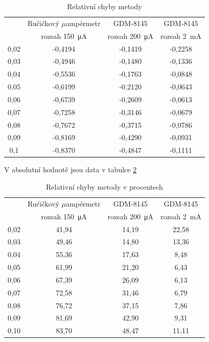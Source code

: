 \documentclass[a4paper,12pt]{article}   %
\newcommand{\tmu}{$\mu$}
\begin{document}
\begin{table}[h!]
    \centering
    \begin{tabular}{|c|c|c|c|}
        \hline
        \rule{0pt}{2.5ex}
        \multirow{2}{*}{Napětí na děliči} &Ručičkový \tmu ampérmetr	&GDM-8145 	&GDM-8145 \\[.7ex]
        & rozsah  150~μA & rozsah 200~μA & rozsah  2~mA \\\hline\hline
        0,02 & -0,4194 & -0,1419 & -0,2258 \\\hline
        0,03 & -0,4946 & -0,1480 & -0,1336 \\\hline 
        0,04 & -0,5536 & -0,1763 & -0,0848 \\\hline 
        0,05 & -0,6199 & -0,2120 & -0,0643 \\\hline
        0,06 & -0,6739 & -0,2609 & -0,0613 \\\hline
        0,07 & -0,7258 & -0,3146 & -0,0679 \\\hline
        0,08 & -0,7672 & -0,3715 & -0,0786 \\\hline
        0,09 & -0,8169 & -0,4290 & -0,0931 \\\hline
        0,1  & -0,8370 & -0,4847 & -0,1111 \\\hline
    \end{tabular}
    \caption{Relativní chyby metody}
    \label{tab:rel}
\end{table}
V absolutní hodnotě jsou data v tabulce \ref{tab:rel_percent}
\begin{table}[h!]
    \centering
    \begin{tabular}{|c|c|c|c|}
        \hline
        \rule{0pt}{2.5ex}
        \multirow{2}{*}{Napětí na děliči} &Ručičkový \tmu ampérmetr	&GDM-8145 	&GDM-8145 \\[.7ex]
        & rozsah  150~μA & rozsah 200~μA & rozsah  2~mA \\\hline\hline
        0,02&41,94&14,19&22,58  \\\hline
        0,03&49,46&14,80&13,36  \\\hline
        0,04&55,36&17,63&8,48   \\\hline
        0,05&61,99&21,20&6,43   \\\hline
        0,06&67,39&26,09&6,13   \\\hline
        0,07&72,58&31,46&6,79   \\\hline
        0,08&76,72&37,15&7,86   \\\hline
        0,09&81,69&42,90&9,31   \\\hline
        0,10&83,70&48,47&11,11  \\\hline
    \end{tabular}
    \caption{Relativní chyby metody v procentech}
    \label{tab:rel_percent}
\end{table}
\end{document}
